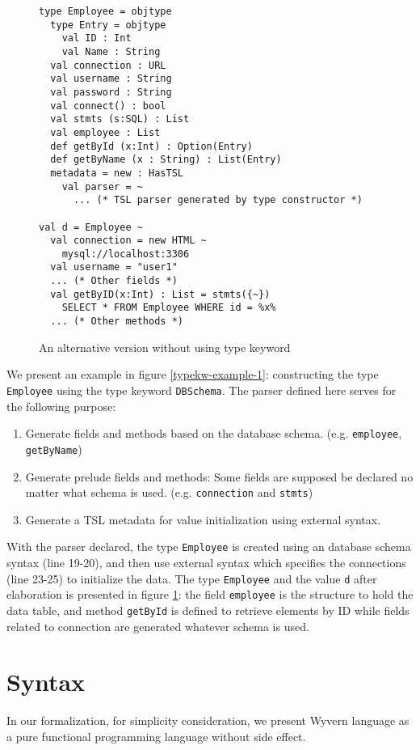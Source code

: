 \documentclass{sig-alternate}
\begin{document}
\begin{figure}[ht]
\begin{lstlisting}[style=wyvern]
type Employee = objtype
  type Entry = objtype
    val ID : Int
    val Name : String 
  val connection : URL
  val username : String
  val password : String
  val connect() : bool
  val stmts (s:SQL) : List
  val employee : List
  def getById (x:Int) : Option(Entry)
  def getByName (x : String) : List(Entry)
  metadata = new : HasTSL
    val parser = ~
      ... (* TSL parser generated by type constructor *)

val d = Employee ~
  val connection = new HTML ~
    mysql://localhost:3306
  val username = "user1"
  ... (* Other fields *)
  val getByID(x:Int) : List = stmts({~})
    SELECT * FROM Employee WHERE id = %x%
  ... (* Other methods *)
\end{lstlisting}
\vspace{-8px}
\caption{An alternative version without using type keyword}
\vspace{-10px}
\label{typekw-example-2}
\end{figure}
We present an example in figure \ref{typekw-example-1}: constructing the type \verb|Employee| using the type keyword \verb|DBSchema|. The parser defined here serves for the following purpose:
\begin{enumerate}\setlength{\itemsep}{0pt}
\item Generate fields and methods based on the database schema. (e.g. \verb|employee|, \verb|getByName|)
\item Generate prelude fields and methods: Some fields are supposed be declared no matter what schema is used. (e.g. \verb|connection| and \verb|stmts|)
\item Generate a TSL metadata for value initialization using external syntax. 
\end{enumerate}
With the parser declared, the type \verb|Employee| is created using an database schema syntax (line 19-20), and then use external syntax which specifies the connections (line 23-25) to initialize the data. The type \verb|Employee| and the value \verb|d| after elaboration is presented in figure \ref{typekw-example-2}: the field \verb|employee| is the structure to hold the data table, and method \verb|getById| is defined to retrieve elements by ID while fields related to connection are generated whatever schema is used.


\section{Syntax}
In our formalization, for simplicity consideration, we present Wyvern language as a pure functional programming language without side effect.
\end{document}
